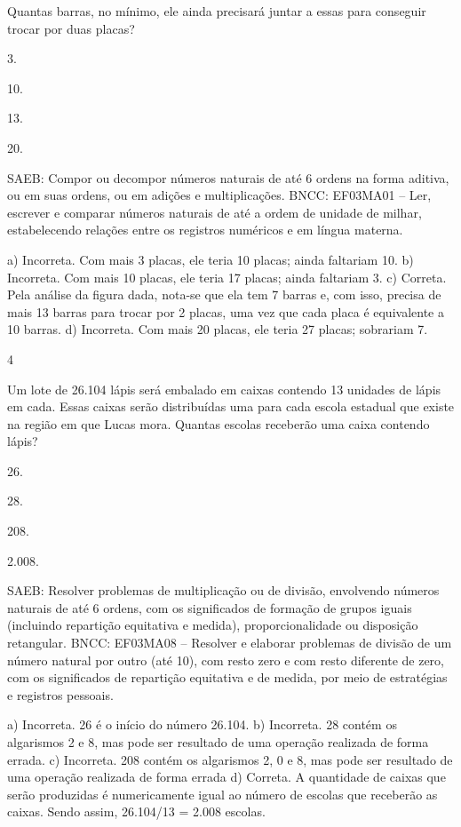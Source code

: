 {\begin{escolha}
{Quantas barras, no mínimo, ele ainda precisará juntar a essas para conseguir trocar por duas placas?

\begin{escolha}
\item
  3.
\item
  10.
\item
  13.
\item
  20.
\end{escolha}

SAEB: Compor ou decompor números naturais de até 6 ordens na forma aditiva, ou em suas ordens, ou em adições e multiplicações.
BNCC: EF03MA01 -- Ler, escrever e comparar números naturais de até a ordem de unidade de milhar, estabelecendo relações entre os registros numéricos e em língua materna.

a) Incorreta. Com mais 3 placas, ele teria 10 placas; ainda faltariam 10.
b) Incorreta. Com mais 10 placas, ele teria 17 placas; ainda faltariam 3.
c) Correta. Pela análise da figura dada, nota-se que ela tem 7 barras e, com isso,
precisa de mais 13 barras para trocar por 2 placas, uma vez que cada placa é equivalente a 10 barras.
d) Incorreta. Com mais 20 placas, ele teria 27 placas; sobrariam 7.

\num{4}

Um lote de 26.104 lápis será embalado em caixas contendo 13 unidades de
lápis em cada. Essas caixas serão distribuídas uma para cada escola
estadual que existe na região em que Lucas mora. Quantas escolas
receberão uma caixa contendo lápis?

\begin{escolha}
\item
  26.
\item
  28.
\item
  208.
\item
  2.008.
\end{escolha}

SAEB: Resolver problemas de multiplicação ou de divisão, envolvendo números naturais de até 6 ordens, com os significados de formação de grupos iguais (incluindo repartição equitativa e medida), proporcionalidade ou disposição retangular.
BNCC: EF03MA08 -- Resolver e elaborar problemas de divisão de um número natural por outro (até
10), com resto zero e com resto diferente de zero, com os significados de repartição equitativa
e de medida, por meio de estratégias e registros pessoais.

a) Incorreta. 26 é o início do número 26.104.
b) Incorreta. 28 contém os algarismos 2 e 8, mas pode ser resultado de uma operação realizada de forma errada.
c) Incorreta. 208 contém os algarismos 2, 0 e 8, mas pode ser resultado de uma operação realizada de forma errada
d) Correta. A quantidade de caixas que serão produzidas é numericamente igual ao número de
escolas que receberão as caixas. Sendo assim, 26.104/13 = 2.008 escolas.

}
\end{escolha}}
